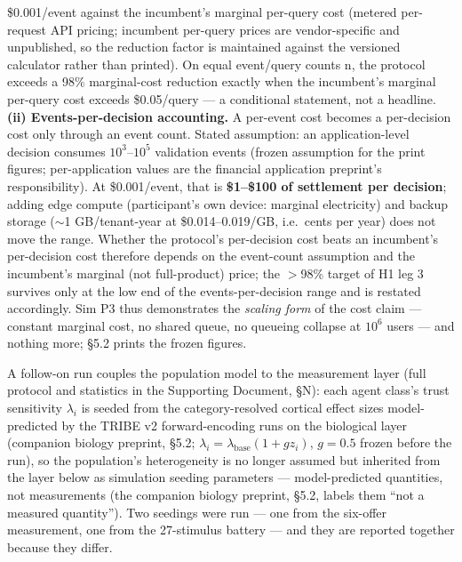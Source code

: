 \documentclass[11pt,twocolumn]{article}
\begin{document}
\begin{itemize}
  \$0.001/event against the incumbent's marginal per-query cost (metered
  per-request API pricing; incumbent per-query prices are
  vendor-specific and unpublished, so the reduction factor is maintained
  against the versioned calculator rather than printed). On equal
  event/query counts n, the protocol exceeds a 98\% marginal-cost
  reduction exactly when the incumbent's marginal per-query cost exceeds
  \$0.05/query --- a conditional statement, not a headline. \textbf{(ii)
  Events-per-decision accounting.} A per-event cost becomes a
  per-decision cost only through an event count. Stated assumption: an
  application-level decision consumes \(10^{3}–10^{5}\) validation
  events (frozen assumption for the print figures; per-application
  values are the financial application preprint's responsibility). At \$0.001/event, that is
  \textbf{\$1--\$100 of settlement per decision}; adding edge compute
  (participant's own device: marginal electricity) and backup storage
  ($\sim$1 GB/tenant-year at \$0.014--0.019/GB, i.e.~cents per
  year) does not move the range. Whether the protocol's per-decision
  cost beats an incumbent's per-decision cost therefore depends on the
  event-count assumption and the incumbent's marginal (not full-product)
  price; the \(>\)98\% target of H1 leg 3 survives only at the
  low end of the events-per-decision range and is restated accordingly.
  Sim P3 thus demonstrates the \emph{scaling form} of the cost claim ---
  constant marginal cost, no shared queue, no queueing collapse at
  \(10^{6}\) users --- and nothing more; §5.2 prints the frozen figures.
\end{itemize}

A follow-on run couples the population model to the measurement layer
(full protocol and statistics in the Supporting Document, §N): each
agent class's trust sensitivity \(\lambda_i\) is seeded from the
category-resolved cortical effect sizes model-predicted by the TRIBE v2
forward-encoding runs on the biological layer (companion biology preprint, §5.2;
\(\lambda_i = \lambda_{\mathrm{base}}(1 + g z_i)\), \(g = 0.5\) frozen
before the run), so the population's heterogeneity is no longer assumed
but inherited from the layer below as simulation seeding parameters ---
model-predicted quantities, not measurements (the companion biology preprint, §5.2, labels them
``not a measured quantity''). Two seedings were run --- one from the
  six-offer measurement, one from the 27-stimulus battery --- and
they are reported together because they differ.
\end{document}
